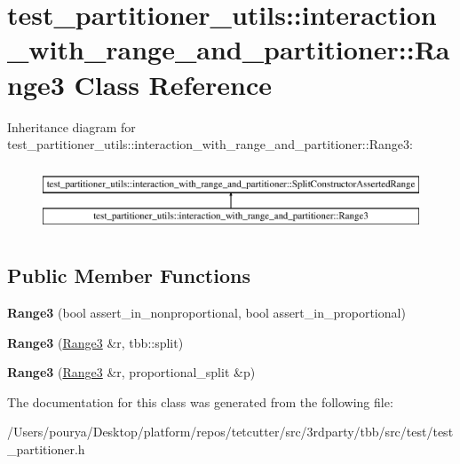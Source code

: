 \hypertarget{classtest__partitioner__utils_1_1interaction__with__range__and__partitioner_1_1Range3}{}\section{test\+\_\+partitioner\+\_\+utils\+:\+:interaction\+\_\+with\+\_\+range\+\_\+and\+\_\+partitioner\+:\+:Range3 Class Reference}
\label{classtest__partitioner__utils_1_1interaction__with__range__and__partitioner_1_1Range3}
Inheritance diagram for test\+\_\+partitioner\+\_\+utils\+:\+:interaction\+\_\+with\+\_\+range\+\_\+and\+\_\+partitioner\+:\+:Range3\+:\begin{figure}[H]
\begin{center}
\leavevmode
\includegraphics[height=2.000000cm]{classtest__partitioner__utils_1_1interaction__with__range__and__partitioner_1_1Range3}
\end{center}
\end{figure}
\subsection*{Public Member Functions}
\begin{DoxyCompactItemize}
\item 
\hypertarget{classtest__partitioner__utils_1_1interaction__with__range__and__partitioner_1_1Range3_adf0a8cef09558a157a9c6f0ae3f2cd18}{}{\bfseries Range3} (bool assert\+\_\+in\+\_\+nonproportional, bool assert\+\_\+in\+\_\+proportional)\label{classtest__partitioner__utils_1_1interaction__with__range__and__partitioner_1_1Range3_adf0a8cef09558a157a9c6f0ae3f2cd18}

\item 
\hypertarget{classtest__partitioner__utils_1_1interaction__with__range__and__partitioner_1_1Range3_adf7fbcbcbadae232dc40821e1cf99175}{}{\bfseries Range3} (\hyperlink{classtest__partitioner__utils_1_1interaction__with__range__and__partitioner_1_1Range3}{Range3} \&r, tbb\+::split)\label{classtest__partitioner__utils_1_1interaction__with__range__and__partitioner_1_1Range3_adf7fbcbcbadae232dc40821e1cf99175}

\item 
\hypertarget{classtest__partitioner__utils_1_1interaction__with__range__and__partitioner_1_1Range3_a786e48e05612bf3fe44c61df92f7891f}{}{\bfseries Range3} (\hyperlink{classtest__partitioner__utils_1_1interaction__with__range__and__partitioner_1_1Range3}{Range3} \&r, proportional\+\_\+split \&p)\label{classtest__partitioner__utils_1_1interaction__with__range__and__partitioner_1_1Range3_a786e48e05612bf3fe44c61df92f7891f}

\end{DoxyCompactItemize}


The documentation for this class was generated from the following file\+:\begin{DoxyCompactItemize}
\item 
/\+Users/pourya/\+Desktop/platform/repos/tetcutter/src/3rdparty/tbb/src/test/test\+\_\+partitioner.\+h\end{DoxyCompactItemize}

